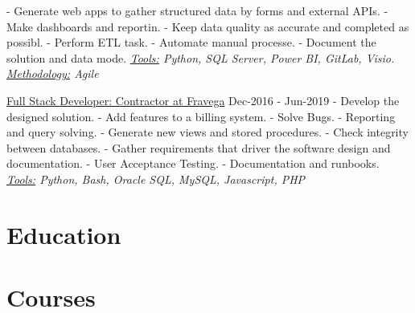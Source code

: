 \documentclass[letterpaper]{twentysecondcv} %
\begin{document}
    \newline- Generate web apps to gather structured data by forms and external APIs.
    \newline- Make dashboards and reportin.
    \newline- Keep data quality as accurate and completed as possibl.
    \newline- Perform ETL task.
    \newline- Automate manual processe.
    \newline- Document the solution and data mode.
    \newline\newline\textit{\underline{Tools:} Python, SQL Server, Power BI, GitLab, Visio. \underline{Methodology:} Agile}
    \newline
    
{\large\underline{Full Stack Developer: Contractor at Fravega}} \hspace*{5pt} Dec-2016 - Jun-2019
    \newline- Develop the designed solution.
    \newline- Add features to a billing system.
    \newline- Solve Bugs.
    \newline- Reporting and query solving.
    \newline- Generate new views and stored procedures.
    \newline- Check integrity between databases.
    \newline- Gather requirements that driver the software design and documentation.
    \newline- User Acceptance Testing.
    \newline- Documentation and runbooks.
    \newline\newline\textit{\underline{Tools:} Python, Bash, Oracle SQL, MySQL, Javascript, PHP}
    \newline


\section{Education}

\begin{twenty} %

\end{twenty}


\section{Courses}


 \begin{twenty}
 \end{twenty}
\end{document}
